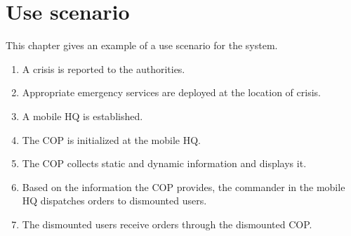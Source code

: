 \chapter{Use scenario}
\label{use_scenario}
This chapter gives an example of a use scenario for the system.

\begin{enumerate}
\item A crisis is reported to the authorities. 
\item Appropriate emergency services are deployed at the location of crisis.
\item A mobile HQ is established.
\item The COP is initialized at the mobile HQ.
\item The COP collects static and dynamic information and displays it.  
\item Based on the information the COP provides, the commander in the mobile HQ dispatches orders to dismounted users.
\item The dismounted users receive orders through the dismounted COP. 

\end{enumerate}